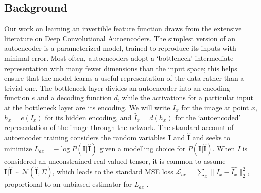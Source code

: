 \subsection{Background}

Our work on learning an invertible feature function draws from the extensive literature on Deep Convolutional Autoencoders. The simplest version of an autoencoder is a parameterized model, trained to reproduce its inputs with minimal error. Most often, autoencoders adopt a `bottleneck' intermediate representation with many fewer dimensions than the input space; this helps ensure that the model learns a useful representation of the data rather than a trivial one. The bottleneck layer divides an autoencoder into an encoding function $e$ and a decoding function $d$, while the activations for a particular input at the bottleneck layer are its encoding. We will write $I_x$ for the image at point $x$, $h_x = e(I_x)$ for its hidden encoding, and $\hat{I}_x = d(h_x)$ for the `autoencoded' representation of the image through the network. The standard account of autoencoder training considers the random variables $\mathbf{I}$ and $\mathbf{\hat{I}}$ and seeks to minimize $L_{ae} = -\log P(\mathbf{I} | \mathbf{\hat{I}})$ given a modelling choice for $P(\mathbf{I} | \mathbf{\hat{I}})$. When $I$ is considered an unconstrained real-valued tensor, it is common to assume $\mathbf{I}|\mathbf{\hat{I}} \sim \mathcal{N}(\mathbf{\hat{I}}, \Sigma)$, which leads to the standard MSE loss $\mathcal{L}_{ae} = \sum_x \| I_x - \hat{I_x}\|_2^2$, proportional to an unbiased estimator for $L_{ae}$ \citep{vincent2010stacked}.

